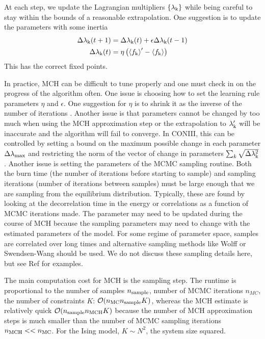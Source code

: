 \documentclass[aps,prl,twocolumn,nofootinbib]{revtex4-1}
\begin{document}
At each step, we update the Lagrangian multipliers $\{\lambda_{\rm k}\}$ while being careful to stay within the bounds of a reasonable extrapolation. One suggestion is to update the parameters with some inertia
\begin{align}
	\Delta\lambda_{\rm k}(t+1) &= \Delta \lambda_{\rm k}(t) + \epsilon \Delta\lambda_{\rm k}(t-1)\label{eq:mch learn1}\\
	\Delta \lambda_{\rm k}(t) &= \eta\left(\left<f_{\rm k}\right>'-\left<f_{\rm k}\right>\right)\label{eq:mch learn2}
\end{align}
This has the correct fixed points.

In practice, MCH can be difficult to tune properly and one must check in on the progress of the algorithm often. One issue is choosing how to set the learning rule parameters $\eta$ and $\epsilon$. One suggestion for $\eta$ is to shrink it as the inverse of the number of iterations \cite{Tkacik:2006vq}. Another issue is that parameters cannot be changed by too much when using the MCH approximation step or the extrapolation to $\lambda_{\rm k}'$ will be inaccurate and the algorithm will fail to converge. In CONIII, this can be controlled by setting a bound on the maximum possible change in each parameter  $\Delta\lambda_{\rm max}$ and restricting the norm of the vector of change in parameters $\sum_k \sqrt{\Delta\lambda_{\rm k}^2}$. Another issue is setting the parameters of the MCMC sampling routine. Both the burn time (the number of iterations before starting to sample) and sampling iterations (number of iterations between samples) must be large enough that we are sampling from the equilibrium distribution.  Typically, these are found by looking at the decorrelation time in the energy or correlations as a function of MCMC iterations made. The parameter may need to be updated during the course of MCH because the sampling parameters may need to change with the estimated parameters of the model. For some regime of parameter space, samples are correlated over long times and alternative sampling methods like Wolff or Swendsen-Wang should be used.
We do not discuss these sampling details here, but see Ref \cite{MacKay:2005wc,Newman:1999wu} for examples.

The main computation cost for MCH is the sampling step. The runtime is proportional to the number of samples $n_{\rm sample}$, number of MCMC iterations $n_{MC}$, the number of constraints $K$:
$\mathcal{O}(n_{\rm MC} n_{\rm sample} K)$, whereas the MCH estimate is relatively quick $\mathcal{O}(n_{\rm sample}n_{\rm MCH}K)$ because the number of MCH approximation steps is much smaller than the number of MCMC sampling iterations $n_{\rm MCH}<<n_{\rm MC}$. 
For the Ising model, $K\sim N^2$, the system size squared.
\end{document}
